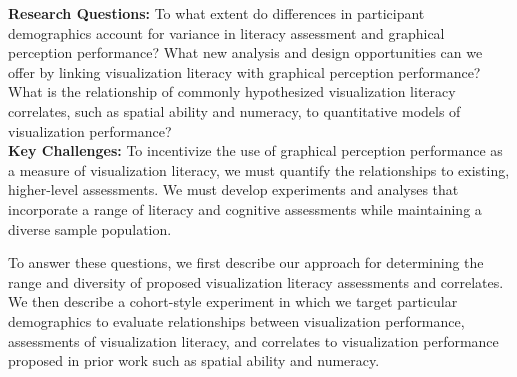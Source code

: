 \documentclass[11pt]{article}
\begin{document}
\vspace{-0.5em}
\noindent\textbf{Research Questions:}
To what extent do differences in participant demographics account for variance in literacy assessment and graphical perception performance?
What new analysis and design opportunities can we offer by linking visualization literacy with graphical perception performance?
What is the relationship of commonly hypothesized visualization literacy correlates, such as spatial ability and numeracy, to quantitative models of visualization performance?
\\
\noindent\textbf{Key Challenges:}
To incentivize the use of graphical perception performance as a measure of visualization literacy, we must quantify the relationships to existing, higher-level assessments.
We must develop experiments and analyses that incorporate a range of literacy and cognitive assessments while maintaining a diverse sample population.

\vspace{-1.0em}
\noindent\hrulefill

To answer these questions, we first describe our approach for determining the range and diversity of proposed visualization literacy assessments and correlates.
We then describe a cohort-style experiment in which we target particular demographics to evaluate relationships between visualization performance, assessments of visualization literacy, and correlates to visualization performance proposed in prior work such as spatial ability and numeracy.
\end{document}
